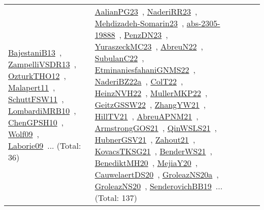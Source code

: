 {\begin{longtable}{lp{3cm}>{\raggedright\arraybackslash}p{6cm}>{\raggedright\arraybackslash}p{6cm}>{\raggedright\arraybackslash}p{8cm}}
\href{../works/BajestaniB13.pdf}{BajestaniB13}~\cite{BajestaniB13}, \href{../works/ZampelliVSDR13.pdf}{ZampelliVSDR13}~\cite{ZampelliVSDR13}, \href{../works/OzturkTHO12.pdf}{OzturkTHO12}~\cite{OzturkTHO12}, \href{../works/Malapert11.pdf}{Malapert11}~\cite{Malapert11}, \href{../works/SchuttFSW11.pdf}{SchuttFSW11}~\cite{SchuttFSW11}, \href{../works/LombardiMRB10.pdf}{LombardiMRB10}~\cite{LombardiMRB10}, \href{../works/ChenGPSH10.pdf}{ChenGPSH10}~\cite{ChenGPSH10}, \href{../works/Wolf09.pdf}{Wolf09}~\cite{Wolf09}, \href{../works/Laborie09.pdf}{Laborie09}~\cite{Laborie09}... (Total: 36) & \href{../works/AalianPG23.pdf}{AalianPG23}~\cite{AalianPG23}, \href{../works/NaderiRR23.pdf}{NaderiRR23}~\cite{NaderiRR23}, \href{../works/Mehdizadeh-Somarin23.pdf}{Mehdizadeh-Somarin23}~\cite{Mehdizadeh-Somarin23}, \href{../works/abs-2305-19888.pdf}{abs-2305-19888}~\cite{abs-2305-19888}, \href{../works/PenzDN23.pdf}{PenzDN23}~\cite{PenzDN23}, \href{../works/YuraszeckMC23.pdf}{YuraszeckMC23}~\cite{YuraszeckMC23}, \href{../works/AbreuN22.pdf}{AbreuN22}~\cite{AbreuN22}, \href{../works/SubulanC22.pdf}{SubulanC22}~\cite{SubulanC22}, \href{../works/EtminaniesfahaniGNMS22.pdf}{EtminaniesfahaniGNMS22}~\cite{EtminaniesfahaniGNMS22}, \href{../works/NaderiBZ22a.pdf}{NaderiBZ22a}~\cite{NaderiBZ22a}, \href{../works/ColT22.pdf}{ColT22}~\cite{ColT22}, \href{../works/HeinzNVH22.pdf}{HeinzNVH22}~\cite{HeinzNVH22}, \href{../works/MullerMKP22.pdf}{MullerMKP22}~\cite{MullerMKP22}, \href{../works/GeitzGSSW22.pdf}{GeitzGSSW22}~\cite{GeitzGSSW22}, \href{../works/ZhangYW21.pdf}{ZhangYW21}~\cite{ZhangYW21}, \href{../works/HillTV21.pdf}{HillTV21}~\cite{HillTV21}, \href{../works/AbreuAPNM21.pdf}{AbreuAPNM21}~\cite{AbreuAPNM21}, \href{../works/ArmstrongGOS21.pdf}{ArmstrongGOS21}~\cite{ArmstrongGOS21}, \href{../works/QinWSLS21.pdf}{QinWSLS21}~\cite{QinWSLS21}, \href{../works/HubnerGSV21.pdf}{HubnerGSV21}~\cite{HubnerGSV21}, \href{../works/Zahout21.pdf}{Zahout21}~\cite{Zahout21}, \href{../works/KovacsTKSG21.pdf}{KovacsTKSG21}~\cite{KovacsTKSG21}, \href{../works/BenderWS21.pdf}{BenderWS21}~\cite{BenderWS21}, \href{../works/BenediktMH20.pdf}{BenediktMH20}~\cite{BenediktMH20}, \href{../works/MejiaY20.pdf}{MejiaY20}~\cite{MejiaY20}, \href{../works/CauwelaertDS20.pdf}{CauwelaertDS20}~\cite{CauwelaertDS20}, \href{../works/GroleazNS20a.pdf}{GroleazNS20a}~\cite{GroleazNS20a}, \href{../works/GroleazNS20.pdf}{GroleazNS20}~\cite{GroleazNS20}, \href{../works/SenderovichBB19.pdf}{SenderovichBB19}~\cite{SenderovichBB19}... (Total: 137)\\

\end{longtable}}
